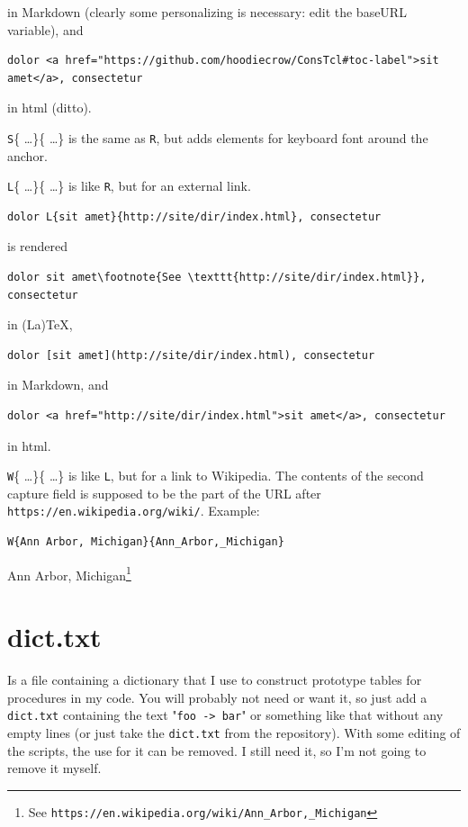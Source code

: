 in Markdown (clearly some personalizing is necessary: edit the baseURL variable), and

\begin{verbatim}
dolor <a href="https://github.com/hoodiecrow/ConsTcl#toc-label">sit amet</a>, consectetur
\end{verbatim}

in html (ditto).

\texttt{S}\{ \ldots  \}\{ \ldots  \} is the same as \texttt{R}, but adds elements for keyboard font around the anchor.

\texttt{L}\{ \ldots  \}\{ \ldots  \} is like \texttt{R}, but for an external link.

\begin{verbatim}
dolor L{sit amet}{http://site/dir/index.html}, consectetur
\end{verbatim}

is rendered

\begin{verbatim}
dolor sit amet\footnote{See \texttt{http://site/dir/index.html}}, consectetur
\end{verbatim}

in (La)TeX,

\begin{verbatim}
dolor [sit amet](http://site/dir/index.html), consectetur
\end{verbatim}

in Markdown, and

\begin{verbatim}
dolor <a href="http://site/dir/index.html">sit amet</a>, consectetur
\end{verbatim}

in html.

\texttt{W}\{ \ldots  \}\{ \ldots  \} is like \texttt{L}, but for a link to Wikipedia. The contents of the second capture field is supposed to be the part of the URL after \texttt{https://en.wikipedia.org/wiki/}. Example:

\begin{verbatim}
W{Ann Arbor, Michigan}{Ann_Arbor,_Michigan}
\end{verbatim}

Ann Arbor, Michigan\footnote{See \texttt{https://en.wikipedia.org/wiki/Ann\_Arbor,\_Michigan}}

\chapter{dict.txt}
\label{dicttxt}

Is a file containing a dictionary that I use to construct prototype tables for procedures in my code. You will probably not need or want it, so just add a \texttt{dict.txt} containing the text "\texttt{foo -> bar}" or something like that without any empty lines (or just take the \texttt{dict.txt} from the repository). With some editing of the scripts, the use for it can be removed. I still need it, so I'm not going to remove it myself.


